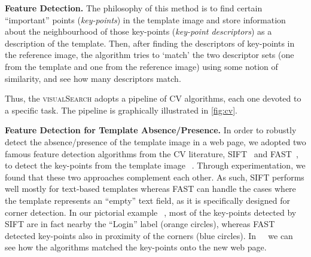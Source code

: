 \noindent
\textbf{Feature Detection.}
The philosophy of this method is to find certain ``important'' points (\textit{key-points}) in the  template image and store information about the neighbourhood of those key-points (\textit{key-point descriptors}) as a description of the template. Then, after finding the descriptors of key-points in the reference image, the algorithm tries to `match' the two descriptor sets (one from the template and one from the reference image) using some notion of similarity, and see how many descriptors match.

Thus, the \textsc{visualSearch} adopts a pipeline of CV algorithms, each one devoted to a specific task. The pipeline is graphically illustrated in \autoref{fig:cv}. 

\noindent
\textbf{Feature Detection for Template Absence/Presence.}
In order to robustly detect the absence/presence of the template image in a web page, we adopted two famous feature detection algorithms from the CV literature, SIFT~\cite{Lowe1999,Lowe2004} and FAST~\cite{rosten2005tracking,rosten2008faster}, to detect the key-points from the template image~\textcircled{}. 
Through experimentation, we found that these two approaches complement each other. As such, SIFT performs well mostly for text-based templates whereas FAST can handle the cases where the template represents an ``empty'' text field, as it is specifically designed for corner detection. In our pictorial example~\textcircled{}, most of the key-points detected by SIFT are in fact nearby the ``Login'' label (orange circles), whereas FAST detected key-points also in proximity of the corners (blue circles). In ~\textcircled{} we can see how the algorithms matched the key-points onto the new web page.
 

